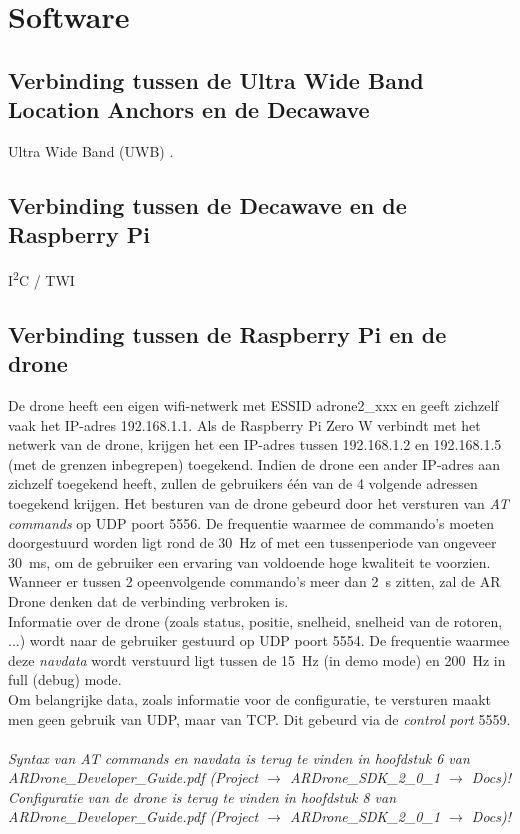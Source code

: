 \chapter{Software}
\section{Verbinding tussen de Ultra Wide Band Location Anchors en de Decawave}
Ultra Wide Band (UWB) \cite{alarifi2016ultra}.

\section{Verbinding tussen de Decawave en de Raspberry Pi}
I\textsuperscript{2}C / TWI

\section{Verbinding tussen de Raspberry Pi en de drone}
De drone heeft een eigen wifi-netwerk met ESSID adrone2\_xxx en geeft zichzelf vaak het IP-adres 192.168.1.1.
Als de Raspberry Pi Zero W verbindt met het netwerk van de drone, krijgen het een IP-adres tussen 192.168.1.2 en 192.168.1.5 (met de grenzen inbegrepen) toegekend.
Indien de drone een ander IP-adres aan zichzelf toegekend heeft, zullen de gebruikers één van de 4 volgende adressen toegekend krijgen.
Het besturen van de drone gebeurd door het versturen van \textit{AT commands} op UDP poort 5556.
De frequentie waarmee de commando's moeten doorgestuurd worden ligt rond de \SI{30}{\Hz} of met een tussenperiode van ongeveer \SI{30}{\ms}, om de gebruiker een ervaring van voldoende hoge kwaliteit te voorzien.
Wanneer er tussen 2 opeenvolgende commando's meer dan \SI{2}{\s} zitten, zal de AR Drone denken dat de verbinding verbroken is.\\
Informatie over de drone (zoals status, positie, snelheid, snelheid van de rotoren, ...) wordt naar de gebruiker gestuurd op UDP poort 5554.
De frequentie waarmee deze \textit{navdata} wordt verstuurd ligt tussen de \SI{15}{\Hz} (in demo mode) en \SI{200}{\Hz} in full (debug) mode.\\
Om belangrijke data, zoals informatie voor de configuratie, te versturen maakt men geen gebruik van UDP, maar van TCP.
Dit gebeurd via de \textit{control port} 5559.\\
\\
\textit{Syntax van AT commands en navdata is terug te vinden in hoofdstuk 6 van ARDrone\_Developer\_Guide.pdf (Project $\to$ ARDrone\_SDK\_2\_0\_1 $\to$ Docs)!}\\
\textit{Configuratie van de drone is terug te vinden in hoofdstuk 8 van ARDrone\_Developer\_Guide.pdf (Project $\to$ ARDrone\_SDK\_2\_0\_1 $\to$ Docs)!}

